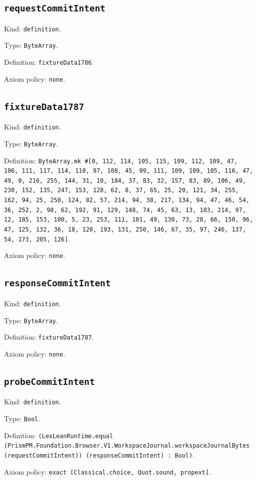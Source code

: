 \documentclass[11pt]{article}
\begin{document}
\subsection*{\texttt{requestCommitIntent}}
\noindent Kind: \texttt{definition}.\par
\noindent Type: \texttt{ByteArray}.\par
\noindent Definition: \texttt{fixtureData1786}.\par
\noindent Axiom policy: \texttt{none}.\par
\subsection*{\texttt{fixtureData1787}}
\noindent Kind: \texttt{definition}.\par
\noindent Type: \texttt{ByteArray}.\par
\noindent Definition: \texttt{ByteArray.mk \#[0, 112, 114, 105, 115, 109, 112, 109, 47, 106, 111, 117, 114, 110, 97, 108, 45, 99, 111, 109, 109, 105, 116, 47, 49, 0, 216, 255, 144, 31, 10, 184, 37, 83, 32, 157, 83, 89, 106, 49, 230, 152, 135, 247, 153, 128, 62, 8, 37, 65, 25, 20, 121, 34, 255, 162, 94, 25, 250, 124, 82, 57, 214, 94, 38, 217, 134, 94, 47, 46, 54, 36, 252, 2, 98, 62, 192, 91, 129, 148, 74, 45, 63, 13, 103, 214, 97, 12, 185, 153, 100, 5, 23, 253, 111, 101, 49, 130, 73, 28, 66, 150, 96, 47, 125, 132, 36, 18, 120, 193, 131, 250, 146, 67, 35, 97, 246, 137, 54, 173, 205, 126]}.\par
\noindent Axiom policy: \texttt{none}.\par
\subsection*{\texttt{responseCommitIntent}}
\noindent Kind: \texttt{definition}.\par
\noindent Type: \texttt{ByteArray}.\par
\noindent Definition: \texttt{fixtureData1787}.\par
\noindent Axiom policy: \texttt{none}.\par
\subsection*{\texttt{probeCommitIntent}}
\noindent Kind: \texttt{definition}.\par
\noindent Type: \texttt{Bool}.\par
\noindent Definition: \texttt{(LexLeanRuntime.equal (PrismPM.Foundation.Browser.V1.WorkspaceJournal.workspaceJournalBytes (requestCommitIntent)) (responseCommitIntent) : Bool)}.\par
\noindent Axiom policy: \texttt{exact [Classical.choice, Quot.sound, propext]}.\par
\end{document}
